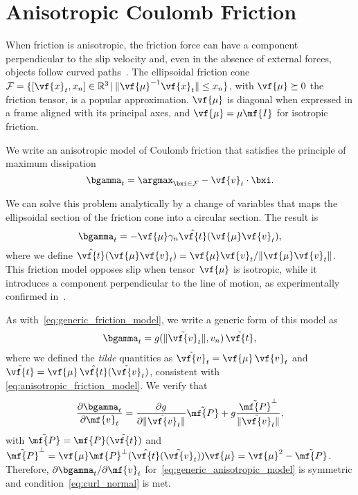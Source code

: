 \section{Anisotropic Coulomb Friction}
\label{sec:anisotropic_friction}

When friction is
anisotropic, the friction force can have a component perpendicular to the slip
velocity and, even in the absence of external forces, objects follow curved
paths~\cite{bib:walker2019}. The ellipsoidal friction cone
$\mathcal{F}=\{[\vf{x}_t,
x_n]\in\mathbb{R}^3\,|\,\Vert\vf{\mu}^{-1}\vf{x}_t\Vert \le x_n\}$, with
$\vf{\mu}\succeq 0$ the friction tensor, is a popular approximation. $\vf{\mu}$
is diagonal when expressed in a frame aligned with its principal axes, and
$\vf{\mu} = \mu\mf{I}$ for isotropic friction.

We write an anisotropic model of Coulomb friction that satisfies
the principle of maximum dissipation
\begin{equation}
    \bgamma_{t}=\argmax_{\bxi\in\mathcal{F}}-\vf{v}_{t}\cdot\bxi.
    \label{eq:maximum_dissipation_principle}
\end{equation}

We can solve this problem analytically by a change of variables that maps the
ellipsoidal section of the friction cone into a circular section. The result is
\begin{equation}
    \bgamma_{t}=-\vf{\mu}\gamma_n\hat{\vf{t}}(\vf{\mu}\vf{v}_{t}),
    \label{eq:anisotropic_friction_model}
\end{equation}
where we define
$\hat{\vf{t}}(\vf{\mu}\vf{v}_{t})=\vf{\mu}\vf{v}_{t}/\Vert\vf{\mu}\vf{v}_{t}\Vert$.
This friction model opposes slip when tensor $\vf{\mu}$ is isotropic, while it
introduces a component perpendicular to the line of motion, as
experimentally confirmed in~\cite{bib:walker2019}.

As with~\eqref{eq:generic_friction_model}, we write a generic form of
this model as
\begin{eqnarray}
    \bgamma_{t}=g(\Vert\tilde{\vf{v}}_t\Vert, v_n)\,\tilde{\vf{t}},
    \label{eq:generic_anisotropic_model}
\end{eqnarray}
where we defined the \emph{tilde} quantities as
$\tilde{\vf{v}}_t=\vf{\mu}\,\vf{v}_{t}$ and
$\tilde{\vf{t}}=\vf{\mu}\,\hat{\vf{t}}(\tilde{\vf{v}}_t)$, consistent with
\eqref{eq:anisotropic_friction_model}. We verify that
\begin{equation*}
    \frac{\partial\bgamma_t}{\partial\mf{v}_t}=\frac{\partial g}{\partial \Vert\tilde{\vf{v}}_t\Vert}\tilde{\mf{P}}+g\frac{\tilde{\mf{P}}^\perp}{\Vert\tilde{\vf{v}}_t\Vert},
\end{equation*}
with $\tilde{\mf{P}}=\mf{P}(\tilde{\vf{t}})$ and $\tilde{\mf{P}}^\perp =
\vf{\mu}\mf{P}^\perp(\hat{\vf{t}}(\tilde{\vf{v}}_t))\vf{\mu}=\vf{\mu}^2-\tilde{\mf{P}}$.
Therefore, $\partial\bgamma_t/\partial\mf{v}_t$ for~\eqref{eq:generic_anisotropic_model}
is symmetric and condition~\eqref{eq:curl_normal} is met.

